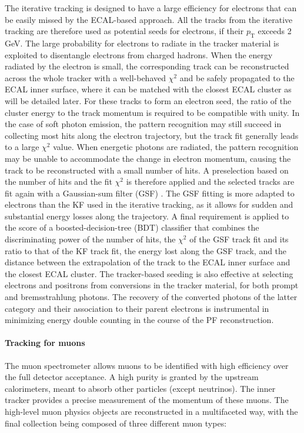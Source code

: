The iterative tracking is designed to have a large efficiency for electrons that can be easily missed by the ECAL-based approach. All the tracks from the iterative tracking are therefore used as potential seeds for electrons, if their $p_{\mathrm{T}}$ exceeds 2 GeV. The large probability for electrons to radiate in the tracker material is exploited to disentangle electrons from charged hadrons. When the energy radiated by the electron is small, the corresponding track can be reconstructed across the whole tracker with a well-behaved $\chi^2$ and be safely propagated to the ECAL inner surface, where it can be matched with the closest ECAL cluster as will be detailed later.  For these tracks to form an electron seed, the ratio of the cluster energy to the track momentum is required to be compatible with unity. In the case of soft photon emission, the pattern recognition may still succeed in collecting most hits along the electron trajectory, but the track fit generally leads to a large $\chi^2$ value.  When energetic photons are radiated, the pattern recognition may be unable to accommodate the change in electron momentum, causing the track to be reconstructed with a small number of hits. A preselection based on the number of hits and the fit $\chi^2$ is therefore applied and the selected tracks are fit again with a Gaussian-sum filter (GSF) \cite{Adam_2005}. The GSF fitting is more adapted to electrons than the KF used in the iterative tracking, as it allows for sudden and substantial energy losses along the trajectory. A final requirement is applied to the score of a boosted-decision-tree (BDT) classifier that combines the discriminating power of the number of hits, the $\chi^2$ of the GSF track fit and its ratio to that of the KF track fit, the energy lost along the GSF track, and the distance between the extrapolation of the track to the ECAL inner surface and the closest ECAL cluster. The tracker-based seeding is also effective at selecting electrons and positrons from conversions in the tracker material, for both prompt and bremsstrahlung photons.  The recovery of the converted photons of the latter category and their association to their parent electrons is instrumental in minimizing energy double counting in the course of the PF reconstruction.


\paragraph{Tracking for muons}

 The  muon  spectrometer  allows muons to be identified with high efficiency over the full detector acceptance.  A high purity is granted by the upstream calorimeters, meant to absorb other particles (except neutrinos).  The inner tracker provides a precise measurement of the momentum of these muons.  The high-level muon physics objects are reconstructed in a multifaceted way, with the final collection being composed of three different muon types:
 
